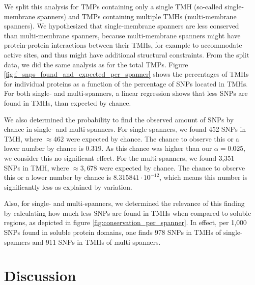 We split this analysis for TMPs containing only a single TMH (so-called single-membrane spanners) and TMPs containing multiple TMHs (multi-membrane spanners). 
We hypothesized that single-membrane spanners are less conserved than multi-membrane spanners,
because multi-membrane spanners
might have protein-protein interactions between their TMHs, 
for example to accommodate active sites, and 
thus might have additional structural constraints.
From the split data, we did the same analysis as for the total TMPs.
Figure \ref{fig:f_snps_found_and_expected_per_spanner} 
shows the percentages of TMHs for individual proteins as a function of the
percentage of SNPs located in TMHs.
For both single- and multi-spanners, a linear regression shows that less
SNPs are found in TMHs, than expected by chance.

We also determined the probability to find the 
observed amount of SNPs  by chance in single- and multi-spanners.
For single-spanners, we found 452 SNPs in TMH, where
$\approx462$ were expected by chance. 
The chance to observe this or a lower number by chance is 
$0.319$. As this chance was higher than our $\alpha = 0.025$,
we consider this no significant effect.
For the multi-spanners, we found 3,351 SNPs in TMH, where 
$\approx3,678$ were expected by chance. 
The chance to observe this or a lower number by chance is 
$8.315841 \cdot 10^{-12}$, 
which means this number is significantly less as explained by variation. 

Also, for single- and multi-spanners, 
we determined the relevance of this finding by
calculating how much less SNPs are found in TMHs
when compared to soluble regions,
as depicted in figure \ref{fig:conservation_per_spanner}.
In effect, per 1,000 SNPs found in soluble protein domains, 
one finds 978 SNPs in TMHs 
of single-spanners
and 911 SNPs in TMHs of multi-spanners.

\section{Discussion}


